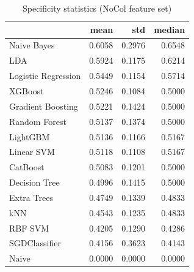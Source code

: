 \begin{table}
\caption{Specificity statistics (NoCol feature set)}
\label{tab:specificity_NoCol_stats}
\begin{tabular}{lrrr}
\toprule
 & mean & std & median \\
\midrule
Naive Bayes & 0.6058 & 0.2976 & 0.6548 \\
LDA & 0.5924 & 0.1175 & 0.6214 \\
Logistic Regression & 0.5449 & 0.1154 & 0.5714 \\
XGBoost & 0.5246 & 0.1084 & 0.5000 \\
Gradient Boosting & 0.5221 & 0.1424 & 0.5000 \\
Random Forest & 0.5137 & 0.1374 & 0.5000 \\
LightGBM & 0.5136 & 0.1166 & 0.5167 \\
Linear SVM & 0.5118 & 0.1108 & 0.5167 \\
CatBoost & 0.5083 & 0.1201 & 0.5000 \\
Decision Tree & 0.4996 & 0.1415 & 0.5000 \\
Extra Trees & 0.4749 & 0.1339 & 0.4833 \\
kNN & 0.4543 & 0.1235 & 0.4833 \\
RBF SVM & 0.4205 & 0.1290 & 0.4286 \\
SGDClassifier & 0.4156 & 0.3623 & 0.4143 \\
Naive & 0.0000 & 0.0000 & 0.0000 \\
\bottomrule
\end{tabular}
\end{table}
